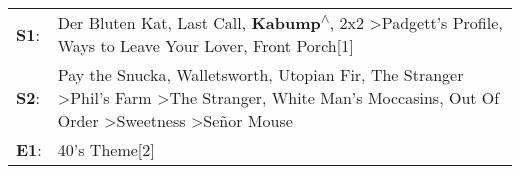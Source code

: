 \begin{supertabular}{p{0.03\textwidth}p{0.92\textwidth}}
 \textbf{S1}:  &                                                                                                                                               Der Bluten Kat\textsuperscript{}, \enspace Last Call\textsuperscript{}, \enspace \textbf{Kabump\textsuperscript{$\wedge$}}, \enspace 2x2\textsuperscript{} \textgreater \enspace Padgett's Profile\textsuperscript{},  Ways to Leave Your Lover\textsuperscript{}, \enspace Front Porch[1]\textsuperscript{}  \enspace  \\
 \textbf{S2}:  &  Pay the Snucka\textsuperscript{}, \enspace Walletsworth\textsuperscript{}, \enspace Utopian Fir\textsuperscript{}, \enspace The Stranger\textsuperscript{} \textgreater \enspace Phil's Farm\textsuperscript{} \textgreater \enspace The Stranger\textsuperscript{}, \enspace White Man's Moccasins\textsuperscript{}, \enspace Out Of Order\textsuperscript{} \textgreater \enspace Sweetness\textsuperscript{} \textgreater \enspace Señor Mouse\textsuperscript{}  \enspace  \\
 \textbf{E1}:  &                                                                                                                                                                                                                                                                                                                                                                                                                                       40's Theme[2]\textsuperscript{}  \enspace  \\
\end{supertabular}
